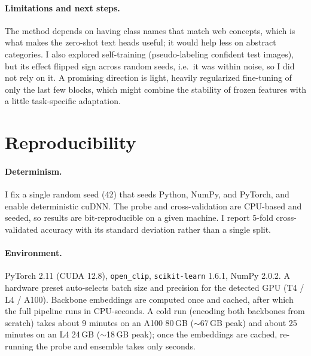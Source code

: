 \documentclass[11pt]{article}
\begin{document}
\paragraph{Limitations and next steps.} The method depends on having class names
that match web concepts, which is what makes the zero-shot text heads useful; it
would help less on abstract categories. I also explored self-training
(pseudo-labeling confident test images), but its effect flipped sign across random
seeds, i.e.\ it was within noise, so I did not rely on it. A promising direction
is light, heavily regularized fine-tuning of only the last few blocks, which might
combine the stability of frozen features with a little task-specific adaptation.

\section{Reproducibility}

\paragraph{Determinism.} I fix a single random seed (42) that seeds Python,
NumPy, and PyTorch, and enable deterministic cuDNN. The probe and cross-validation
are CPU-based and seeded, so results are bit-reproducible on a given machine. I
report 5-fold cross-validated accuracy with its standard deviation rather than a
single split.

\paragraph{Environment.} PyTorch 2.11 (CUDA 12.8), \texttt{open\_clip},
\texttt{scikit-learn} 1.6.1, NumPy 2.0.2. A hardware preset auto-selects batch size
and precision for the detected GPU (T4 / L4 / A100). Backbone embeddings are
computed once and cached, after which the full pipeline runs in CPU-seconds. A cold
run (encoding both backbones from scratch) takes about 9 minutes on an A100 80\,GB
($\sim$67\,GB peak) and about 25 minutes on an L4 24\,GB ($\sim$18\,GB peak); once
the embeddings are cached, re-running the probe and ensemble takes only seconds.
\end{document}
